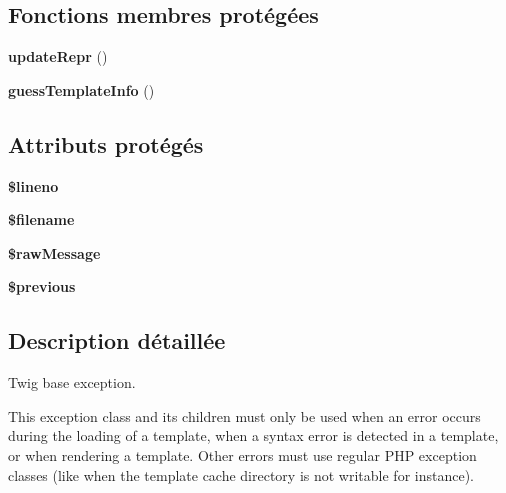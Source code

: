 \subsection*{Fonctions membres protégées}
\begin{DoxyCompactItemize}
\item 
{\bfseries update\+Repr} ()\hypertarget{class_twig___error_a94da5702d909e30f9dafe5f95c67bf1b}{}\label{class_twig___error_a94da5702d909e30f9dafe5f95c67bf1b}

\item 
{\bfseries guess\+Template\+Info} ()\hypertarget{class_twig___error_ae755138687d06c7ddb918be2c55c215d}{}\label{class_twig___error_ae755138687d06c7ddb918be2c55c215d}

\end{DoxyCompactItemize}
\subsection*{Attributs protégés}
\begin{DoxyCompactItemize}
\item 
{\bfseries \$lineno}\hypertarget{class_twig___error_a865384ce49abf1c78f8aea48c7b5aa48}{}\label{class_twig___error_a865384ce49abf1c78f8aea48c7b5aa48}

\item 
{\bfseries \$filename}\hypertarget{class_twig___error_a0722441477f957078ee2437054556cbc}{}\label{class_twig___error_a0722441477f957078ee2437054556cbc}

\item 
{\bfseries \$raw\+Message}\hypertarget{class_twig___error_a51b60eefca71be4dca4091bc91c65cd4}{}\label{class_twig___error_a51b60eefca71be4dca4091bc91c65cd4}

\item 
{\bfseries \$previous}\hypertarget{class_twig___error_a4774a105bfb14b9d24aa2357408f32f8}{}\label{class_twig___error_a4774a105bfb14b9d24aa2357408f32f8}

\end{DoxyCompactItemize}


\subsection{Description détaillée}
Twig base exception.

This exception class and its children must only be used when an error occurs during the loading of a template, when a syntax error is detected in a template, or when rendering a template. Other errors must use regular P\+HP exception classes (like when the template cache directory is not writable for instance).

